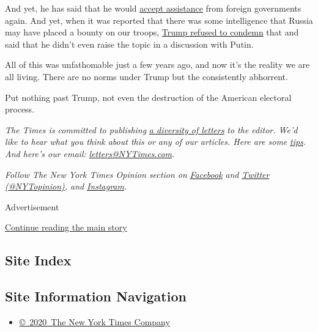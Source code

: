 And yet, he has said that he would
\href{https://abcnews.go.com/Politics/id-exclusive-interview-trump-listen-foreigners-offered-dirt/story?id=63669304}{accept
assistance} from foreign governments again. And yet, when it was
reported that there was some intelligence that Russia may have placed a
bounty on our troops,
\href{https://www.axios.com/trump-russia-bounties-taliban-putin-call-4a0f6110-ab58-41c0-96fc-57b507462af1.html}{Trump
refused to condemn} that and said that he didn't even raise the topic in
a discussion with Putin.

All of this was unfathomable just a few years ago, and now it's the
reality we are all living. There are no norms under Trump but the
consistently abhorrent.

Put nothing past Trump, not even the destruction of the American
electoral process.

\emph{The Times is committed to publishing}
\href{https://www.nytimes3xbfgragh.onion/2019/01/31/opinion/letters/letters-to-editor-new-york-times-women.html}{\emph{a
diversity of letters}} \emph{to the editor. We'd like to hear what you
think about this or any of our articles. Here are some}
\href{https://help.nytimes3xbfgragh.onion/hc/en-us/articles/115014925288-How-to-submit-a-letter-to-the-editor}{\emph{tips}}\emph{.
And here's our email:}
\href{mailto:letters@NYTimes.com}{\emph{letters@NYTimes.com}}\emph{.}

\emph{Follow The New York Times Opinion section on}
\href{https://www.facebookcorewwwi.onion/nytopinion}{\emph{Facebook}}
\emph{and} \href{http://twitter.com/NYTOpinion}{\emph{Twitter
(@NYTopinion)}}\emph{, and}
\href{https://www.instagram.com/nytopinion/}{\emph{Instagram}}\emph{.}

Advertisement

\protect\hyperlink{after-bottom}{Continue reading the main story}

\hypertarget{site-index}{%
\subsection{Site Index}\label{site-index}}

\hypertarget{site-information-navigation}{%
\subsection{Site Information
Navigation}\label{site-information-navigation}}

\begin{itemize}
\tightlist
\item
  \href{https://help.nytimes3xbfgragh.onion/hc/en-us/articles/115014792127-Copyright-notice}{©~2020~The
  New York Times Company}
\end{itemize}

